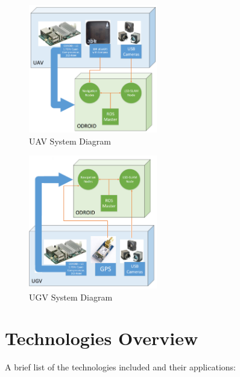 \begin{figure}[tbh]
\begin{center}
\includegraphics[width=0.5\textwidth]{resources/diagram/SysDiagUAV}
\end{center}
\caption{UAV System Diagram \label{systemdiagram}}
\end{figure}


\begin{figure}[tbh]
\begin{center}
\includegraphics[width=0.5\textwidth]{resources/diagram/SysDiagUGV}
\end{center}
\caption{UGV System Diagram \label{systemdiagram}}
\end{figure}


\section{Technologies Overview}
A brief list of the technologies included and their applications:


